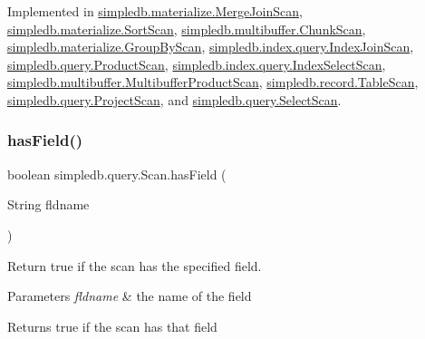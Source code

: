 Implemented in \hyperlink{classsimpledb_1_1materialize_1_1MergeJoinScan_a7c6aaa5825fbb2b3ca2ebd7ceb49ba5d}{simpledb.\+materialize.\+Merge\+Join\+Scan}, \hyperlink{classsimpledb_1_1materialize_1_1SortScan_a6be5b206585dbd12c251a203364b5b1f}{simpledb.\+materialize.\+Sort\+Scan}, \hyperlink{classsimpledb_1_1multibuffer_1_1ChunkScan_a8c5c7202add0289c7fc15f036332db96}{simpledb.\+multibuffer.\+Chunk\+Scan}, \hyperlink{classsimpledb_1_1materialize_1_1GroupByScan_acb46660cae0539050eb6041f6310425f}{simpledb.\+materialize.\+Group\+By\+Scan}, \hyperlink{classsimpledb_1_1index_1_1query_1_1IndexJoinScan_a8a554a0f56fcfe981c302e4929e2c211}{simpledb.\+index.\+query.\+Index\+Join\+Scan}, \hyperlink{classsimpledb_1_1query_1_1ProductScan_ade690f4d248b8d489e9565bb73e0cf59}{simpledb.\+query.\+Product\+Scan}, \hyperlink{classsimpledb_1_1index_1_1query_1_1IndexSelectScan_a2fc2cb0693d8c75ab2265b920f923439}{simpledb.\+index.\+query.\+Index\+Select\+Scan}, \hyperlink{classsimpledb_1_1multibuffer_1_1MultibufferProductScan_acb1cdfd6dfe1b848e423bfb4b513b48f}{simpledb.\+multibuffer.\+Multibuffer\+Product\+Scan}, \hyperlink{classsimpledb_1_1record_1_1TableScan_a0a4ad2c10c2c60f3c984876c672e15e1}{simpledb.\+record.\+Table\+Scan}, \hyperlink{classsimpledb_1_1query_1_1ProjectScan_a519337a8db86470d88e8bc24c068e53b}{simpledb.\+query.\+Project\+Scan}, and \hyperlink{classsimpledb_1_1query_1_1SelectScan_a5e5fcf6179ecbbb316e6fde68a04dc7f}{simpledb.\+query.\+Select\+Scan}.

\mbox{\label{interfacesimpledb_1_1query_1_1Scan_a8f4ccf13eed0bed983c928e9b998fe5c}} 
\subsubsection{\texorpdfstring{has\+Field()}{hasField()}}
{\footnotesize\ttfamily boolean simpledb.\+query.\+Scan.\+has\+Field (\begin{DoxyParamCaption}\item[{String}]{fldname }\end{DoxyParamCaption})}

Return true if the scan has the specified field. 
\begin{DoxyParams}{Parameters}
{\em fldname} & the name of the field \\
\hline
\end{DoxyParams}
\begin{DoxyReturn}{Returns}
true if the scan has that field 
\end{DoxyReturn}


